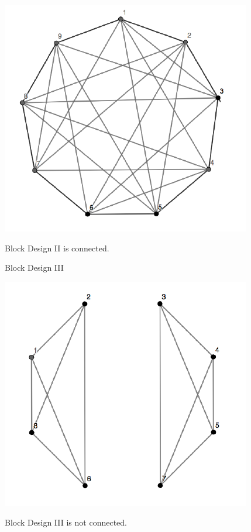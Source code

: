 \documentclass[12pt,]{article}
\begin{document}
\begin{center}\includegraphics{Markdown_HW_8_files/figure-latex/unnamed-chunk-8-1} \end{center}

Block Design II is connected.

\begin{center}
Block Design III
\end{center}

\begin{center}\includegraphics{Markdown_HW_8_files/figure-latex/unnamed-chunk-9-1} \end{center}

Block Design III is not connected.
\end{document}
